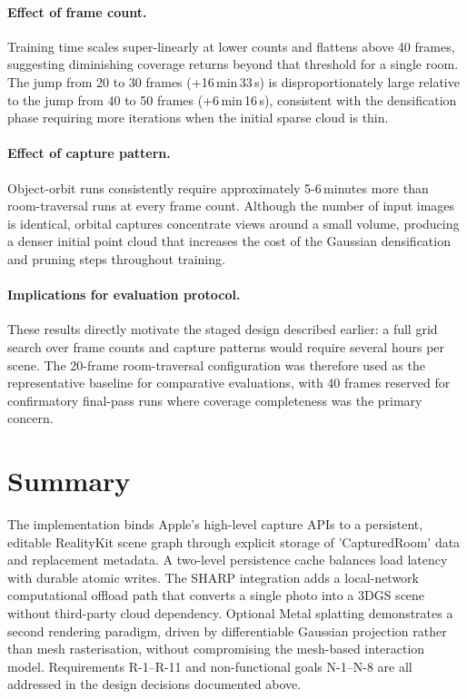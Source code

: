 \paragraph{Effect of frame count.}
Training time scales super-linearly at lower counts and flattens above
40 frames, suggesting diminishing coverage returns beyond that threshold for
a single room. The jump from 20 to 30 frames (+16\,min\,33\,s) is
disproportionately large relative to the jump from 40 to 50 frames
(+6\,min\,16\,s), consistent with the densification phase requiring more
iterations when the initial sparse cloud is thin.

\paragraph{Effect of capture pattern.}
Object-orbit runs consistently require approximately 5-6\,minutes more than
room-traversal runs at every frame count. Although the number of input images
is identical, orbital captures concentrate views around a small volume,
producing a denser initial point cloud that increases the cost of the Gaussian
densification and pruning steps throughout training.

\paragraph{Implications for evaluation protocol.}
These results directly motivate the staged design described earlier: a full
grid search over frame counts and capture patterns would require several hours
per scene. The 20-frame room-traversal configuration was therefore used as the
representative baseline for comparative evaluations, with 40 frames reserved
for confirmatory final-pass runs where coverage completeness was the primary
concern.
\section{Summary}

The implementation binds Apple's high-level capture APIs to a persistent, editable RealityKit scene graph through explicit storage of 'CapturedRoom' data and replacement metadata. A two-level persistence cache balances load latency with durable atomic writes. The SHARP integration adds a local-network computational offload path that converts a single photo into a 3DGS scene without third-party cloud dependency. Optional Metal splatting demonstrates a second rendering paradigm, driven by differentiable Gaussian projection rather than mesh rasterisation, without compromising the mesh-based interaction model. Requirements R-1--R-11 and non-functional goals N-1--N-8 are all addressed in the design decisions documented above.
